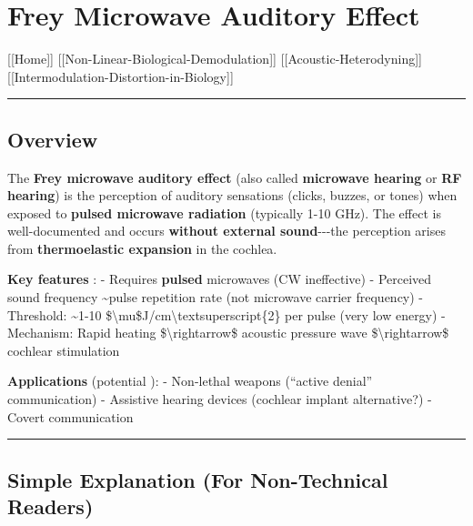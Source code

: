 \section{Frey Microwave Auditory
Effect}\label{frey-microwave-auditory-effect}

{[}{[}Home{]}{]} \textbar{}
{[}{[}Non-Linear-Biological-Demodulation{]}{]} \textbar{}
{[}{[}Acoustic-Heterodyning{]}{]} \textbar{}
{[}{[}Intermodulation-Distortion-in-Biology{]}{]}

\begin{center}\rule{0.5\linewidth}{0.5pt}\end{center}

\subsection{Overview}\label{overview}

The \textbf{Frey microwave auditory effect} (also called
\textbf{microwave hearing} or \textbf{RF hearing}) is the perception of
auditory sensations (clicks, buzzes, or tones) when exposed to
\textbf{pulsed microwave radiation} (typically 1-10 GHz). The effect is
well-documented and occurs \textbf{without external sound}-\/-\/-the
perception arises from \textbf{thermoelastic expansion} in the cochlea.

\textbf{Key features} : - Requires \textbf{pulsed} microwaves (CW
ineffective) - Perceived sound frequency \textasciitilde pulse
repetition rate (not microwave carrier frequency) - Threshold:
\textasciitilde1-10
\$\textbackslash mu\$J/cm\textbackslash textsuperscript\{2\} per pulse
(very low energy) - Mechanism: Rapid heating
\$\textbackslash rightarrow\$ acoustic pressure wave
\$\textbackslash rightarrow\$ cochlear stimulation

\textbf{Applications} (potential ): - Non-lethal weapons (``active
denial'' communication) - Assistive hearing devices (cochlear implant
alternative?) - Covert communication

\begin{center}\rule{0.5\linewidth}{0.5pt}\end{center}

\subsection{\texorpdfstring{Simple Explanation (For Non-Technical
Readers)
}{Simple Explanation (For Non-Technical Readers) }}\label{simple-explanation-for-non-technical-readers}

